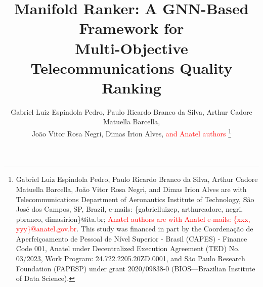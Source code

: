 \documentclass[english]{sbrt}
\begin{document}

\newcommand{\iqsrev}{\mathrm{IQS}_\mathrm{rev}}
\newcommand{\iqsleg}{\mathrm{IQS}_\mathrm{leg}}

\newcommand{\Xraw}{\mathbf{X}^\mathrm{raw}}
\newcommand{\xraw}{\mathbf{x}^\mathrm{raw}}

\newcommand{\Xpareto}{\mathbf{X}^\mathrm{pareto}}
\newcommand{\xpareto}{\mathbf{x}^\mathrm{pareto}}

\newcommand{\Xmodel}{\mathbf{X}^\mathrm{model}}
\newcommand{\xmodel}{\mathbf{x}^\mathrm{model}}

\newcommand{\Xlog}{\mathbf{X}^\mathrm{log}}
\newcommand{\xlog}{\mathbf{x}^\mathrm{log}}

\title{Manifold Ranker: A GNN-Based Framework for\\Multi-Objective Telecommunications Quality Ranking}

\author{Gabriel Luiz Espindola Pedro, Paulo Ricardo Branco da Silva, Arthur Cadore Matuella Barcella,\\ João Vitor Rosa Negri, Dimas Irion Alves, \textcolor{red}{and Anatel authors}
\thanks{Gabriel Luiz Espindola Pedro, Paulo Ricardo Branco da Silva, Arthur Cadore Matuella Barcella, João Vitor Rosa Negri, and Dimas Irion Alves are with Telecommunications Department of Aeronautics Institute of Technology, São José dos Campos, SP, Brazil, e-mails: \{gabrielluizep, arthurcadore, negri, pbranco, dimasirion\}@ita.br; \textcolor{red}{Anatel authors are with Anatel e-mails: \{xxx, yyy\}@anatel.gov.br}. This study was financed in part by the Coordenação de Aperfeiçoamento de Pessoal de Nível Superior - Brasil (CAPES) - Finance Code  001, Anatel under Decentralized Execution Agreement (TED) No. 03/2023, Work Program: 24.722.2205.20ZD.0001, and São Paulo Research Foundation (FAPESP) under grant 2020/09838-0 (BIOS---Brazilian Institute of Data Science).}%
}

\maketitle

\end{document}
